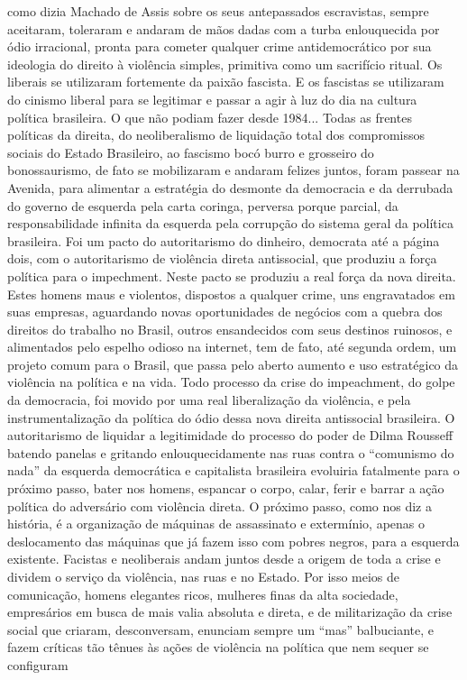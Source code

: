 como dizia Machado de Assis sobre os seus antepassados escravistas,
sempre aceitaram, toleraram e andaram de mãos dadas com a turba
enlouquecida por ódio irracional, pronta para cometer qualquer crime
antidemocrático por sua ideologia do direito à violência simples,
primitiva como um sacrifício ritual. Os liberais se utilizaram
fortemente da paixão fascista. E os fascistas se utilizaram do cinismo
liberal para se legitimar e passar a agir à luz do dia na cultura
política brasileira. O que não podiam fazer desde 1984... Todas as
frentes políticas da direita, do neoliberalismo de liquidação total dos
compromissos sociais do Estado Brasileiro, ao fascismo bocó burro e
grosseiro do bonossaurismo, de fato se mobilizaram e andaram felizes
juntos, foram passear na Avenida, para alimentar a estratégia do
desmonte da democracia e da derrubada do governo de esquerda pela carta
coringa, perversa porque parcial, da responsabilidade infinita da
esquerda pela corrupção do sistema geral da política brasileira. Foi um
pacto do autoritarismo do dinheiro, democrata até a página dois, com o
autoritarismo de violência direta antissocial, que produziu a força
política para o impechment. Neste pacto se produziu a real força da nova
direita. Estes homens maus e violentos, dispostos a qualquer crime, uns
engravatados em suas empresas, aguardando novas oportunidades de
negócios com a quebra dos direitos do trabalho no Brasil, outros
ensandecidos com seus destinos ruinosos, e alimentados pelo espelho
odioso na internet, tem de fato, até segunda ordem, um projeto comum
para o Brasil, que passa pelo aberto aumento e uso estratégico da
violência na política e na vida. Todo processo da crise do impeachment,
do golpe da democracia, foi movido por uma real liberalização da
violência, e pela instrumentalização da política do ódio dessa nova
direita antissocial brasileira. O autoritarismo de liquidar a
legitimidade do processo do poder de Dilma Rousseff batendo panelas e
gritando enlouquecidamente nas ruas contra o ``comunismo do nada'' da
esquerda democrática e capitalista brasileira evoluiria fatalmente para
o próximo passo, bater nos homens, espancar o corpo, calar, ferir e
barrar a ação política do adversário com violência direta. O próximo
passo, como nos diz a história, é a organização de máquinas de
assassinato e extermínio, apenas o deslocamento das máquinas que já
fazem isso com pobres negros, para a esquerda existente. Facistas e
neoliberais andam juntos desde a origem de toda a crise e dividem o
serviço da violência, nas ruas e no Estado. Por isso meios de
comunicação, homens elegantes ricos, mulheres finas da alta sociedade,
empresários em busca de mais valia absoluta e direta, e de militarização
da crise social que criaram, desconversam, enunciam sempre um ``mas''
balbuciante, e fazem críticas tão tênues às ações de violência na
política que nem sequer se configuram

